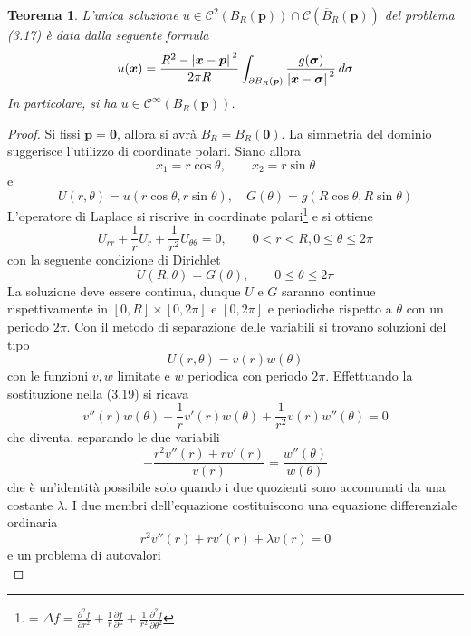 \documentclass[a4paper,12pt, draft]{article}
\theoremstyle{break}
\newtheorem{theorem}{Teorema}[section]
\numberwithin{equation}{section}
\begin{document}
\begin{theorem}
  L'unica soluzione \(u \in \mathcal{C}^2(B_R(\bm{p})) \cap \mathcal{C}(\overline{B}_R(\bm{p}))\) del problema (3.17) è data dalla seguente formula
  \begin{equation}
    u(\bm{x}) = \frac{R^2 - \abs*{\bm{x}- \bm{p}}^2}{2\pi R}\int_{\partial B_R(\bm{p})} \frac{g(\bm{\sigma})}{\abs*{\bm{x}-\bm{\sigma}}^2} \, d\sigma
  \end{equation}
  In particolare, si ha \(u \in \mathcal{C}^{\infty}(B_R(\bm{p}))\).
\end{theorem}
\begin{proof}
  Si fissi \(\bm{p} = \bm{0}\), allora si avrà \(B_R = B_R(\bm{0})\). La simmetria del dominio suggerisce l'utilizzo di coordinate polari. Siano allora 
  \[
  x_1 = r\cos\theta, \qquad x_2 = r \sin\theta
  \]
  e 
  \[
    U(r, \theta) = u(r\cos\theta, r\sin\theta), \quad G(\theta) = g(R \cos \theta, R \sin \theta)
  \]
  L'operatore di Laplace si riscrive in coordinate polari\footnote{{\everymath = {\displaystyle}\(\Delta f = \frac{\partial^2 f}{\partial r^2} + \frac{1}{r}\frac{\partial f}{\partial r} + \frac{1}{r^2}\frac{\partial^2 f}{\partial \theta^2}\)}} e si ottiene
  \begin{equation}
    U_{rr} + \frac{1}{r} U_r + \frac{1}{r^2}U_{\theta\theta} = 0, \qquad 0 < r < R, 0 \leq \theta \leq 2\pi
  \end{equation}
con la seguente condizione di Dirichlet
\[
U(R, \theta) = G(\theta), \qquad 0 \leq \theta \leq 2\pi
\]
La soluzione deve essere continua, dunque \(U\) e \(G\) saranno continue rispettivamente in \([0,R] \times [0, 2\pi]\) e \([0,2\pi]\) e periodiche rispetto a \(\theta\) con un periodo \(2\pi\).
Con il metodo di separazione delle variabili si trovano soluzioni del tipo 
\[
  U(r, \theta) = v(r)w(\theta)
\]
con le funzioni \(v,w\) limitate e \(w\) periodica con periodo \(2\pi\). Effettuando la sostituzione nella (3.19) si ricava 
\[
  v''(r)w(\theta) + \frac{1}{r} v'(r)w(\theta)+\frac{1}{r^2} v(r)w''(\theta) = 0\]
  che diventa, separando le due variabili
  \[
  -\frac{r^2v''(r)+rv'(r)}{v(r)} = \frac{w''(\theta)}{w(\theta)}  
  \] 
  che è un'identità possibile solo quando i due quozienti sono accomunati da una costante \(\lambda\). I due membri dell'equazione costituiscono una equazione differenziale ordinaria
  \begin{equation}
    r^2v''(r) + rv'(r) + \lambda v(r) = 0
  \end{equation}
  e un problema di autovalori
  \begin{equation}

\end{equation}
\end{proof}
\end{document}
